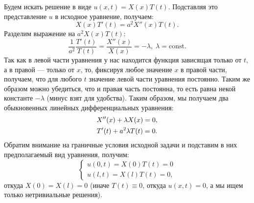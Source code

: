\documentclass[11pt]{article}
\begin{document}
Будем искать решение в виде $u(x, t) = X(x)T(t)$. Подставляя это представление $u$ в исходное уравнение, получаем:
$$
X(x)T'(t) = a^2X''(x)T(t).
$$
Разделим выражение на $a^2X(x)T(t)$:
$$
\frac{1}{a^2} \frac{T'(t)}{T(t)} = \frac{X''(x)}{X(x)} = -\lambda, \; \lambda = \mathrm{const}.
$$
Так как в левой части уравнения у нас находится функция зависящая только от $t$, а в правой --- только от $x$, то, фиксируя любое значение $x$ в правой части, получаем, что для любого $t$ значение левой части уравнения постоянно. Таким же образом можно убедиться, что и правая часть постоянна, то есть равна некой константе $-\lambda$ (минус взят для удобства). Таким образом, мы получаем два обыкновенных линейных дифференциальных уравнения:
\begin{gather}
X''(x) + \lambda X(x) = 0, \notag \\
T'(t) + a^2 \lambda T(t) = 0. \notag
\end{gather}
Обратим внимание на граничные условия исходной задачи и подставим в них предполагаемый вид уравнения, получим:
$$
\left\{
\begin{aligned}
u(0, t) = X(0)T(t) = 0 \\
u(l, t) = X(l)T(t) = 0,
\end{aligned}
\right.
$$
откуда $X(0) = X(l) = 0$ (иначе $T(t) \equiv 0$, откуда $u(x, t) = 0$, а мы ищем только нетривиальные решения).
\end{document}
